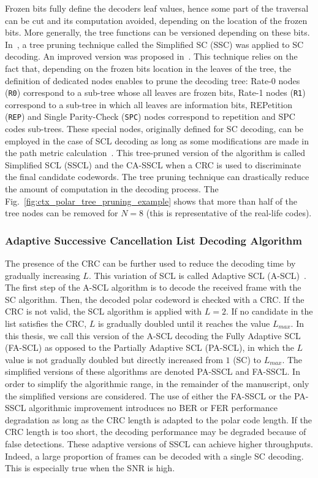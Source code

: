 Frozen bits fully define the decoders leaf values, hence some part of the
traversal can be cut and its computation avoided, depending on the location of
the frozen bits. More generally, the tree functions can be versioned depending
on these bits. In~\cite{Alamdar-Yazdi2011}, a tree pruning technique called the
Simplified SC (SSC) was applied to SC decoding. An improved version was proposed
in~\cite{Sarkis2014a}. This technique relies on the fact that, depending on the
frozen bits location in the leaves of the tree, the definition of dedicated
nodes enables to prune the decoding tree: Rate-0 nodes (\verb|R0|) correspond to
a sub-tree whose all leaves are frozen bits, Rate-1 nodes (\verb|R1|) correspond
to a sub-tree in which all leaves are information bits, REPetition (\verb|REP|)
and Single Parity-Check (\verb|SPC|) nodes correspond to repetition and SPC
codes sub-trees. These special nodes, originally defined for SC decoding, can be
employed in the case of SCL decoding as long as some modifications are made in
the path metric calculation~\cite{Sarkis2016}. This tree-pruned version of the
algorithm is called Simplified SCL (SSCL) and the CA-SSCL when a CRC is used to
discriminate the final candidate codewords. The tree pruning technique can
drastically reduce the amount of computation in the decoding process. The
Fig.~\ref{fig:ctx_polar_tree_pruning_example} shows that more than half of the
tree nodes can be removed for $N = 8$ (this is representative of the real-life
codes).

\subsubsection{Adaptive Successive Cancellation List Decoding Algorithm}
\label{sec:ctx_polar_ascl}

The presence of the CRC can be further used to reduce the decoding time by
gradually increasing $L$. This variation of SCL is called Adaptive SCL
(A-SCL)~\cite{Li2012}. The first step of the A-SCL algorithm is to decode the
received frame with the SC algorithm. Then, the decoded polar codeword is
checked with a CRC. If the CRC is not valid, the SCL algorithm is applied with
$L=2$. If no candidate in the list satisfies the CRC, $L$ is gradually doubled
until it reaches the value $L_{max}$. In this thesis, we call this version of
the A-SCL decoding the Fully Adaptive SCL (FA-SCL) as opposed to the Partially
Adaptive SCL (PA-SCL), in which the $L$ value is not gradually doubled but
directly increased from $1$ (SC) to $L_{max}$. The simplified versions of these
algorithms are denoted PA-SSCL and FA-SSCL. In order to simplify the algorithmic
range, in the remainder of the manuscript, only the simplified versions are
considered. The use of either the FA-SSCL or the PA-SSCL algorithmic improvement
introduces no BER or FER performance degradation as long as the CRC length is
adapted to the polar code length. If the CRC length is too short, the decoding
performance may be degraded because of false detections. These adaptive versions
of SSCL can achieve higher throughputs. Indeed, a large proportion of frames can
be decoded with a single SC decoding. This is especially true when the SNR is
high.


